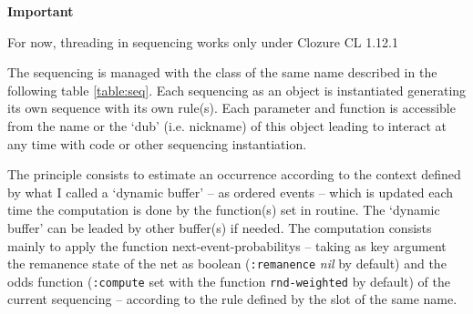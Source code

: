  \begin{notes}

{\large \textbf{Important}}

For now, threading in sequencing works only under Clozure CL 1.12.1

\end{notes}

\bigskip

The sequencing is managed with the class of the same name described in the following table \ref{table:seq}. Each sequencing as an object is instantiated generating its own sequence with its own rule(s). Each parameter and function is accessible from the name or the `dub' (i.e. nickname) of this object leading to interact at any time with code or other sequencing instantiation.

\smallskip

The principle consists to estimate an occurrence according to the context defined by what I called a `dynamic buffer' -- as ordered events -- which is updated each time the computation is done by the function(s) set in routine. The `dynamic buffer' can be leaded by other buffer(s) if needed. The computation consists mainly to apply the function \glspl{next-event-probability} -- taking as key argument the remanence state of the net as boolean (\texttt{:remanence} \textit{nil} by default)  and the odds function (\texttt{:compute} set with the function \texttt{rnd-weighted} by default) of the current sequencing --  according to the rule defined by the slot of the same name. 

\bigskip 

